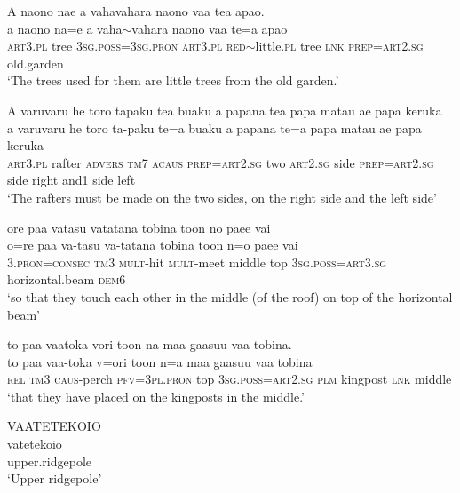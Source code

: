 \ea\label{ex:text11-30}
A naono nae a vahavahara naono vaa tea apao.\\
\gll a	naono	na=e	a	vaha{$\sim$}vahara	naono	vaa	te=a	apao\\
     \textsc{art}3.\textsc{pl}	tree	3\textsc{sg}.\textsc{poss}=3\textsc{sg}.\textsc{pron}	\textsc{art}3.\textsc{pl}	\textsc{red}{$\sim$}little.\textsc{pl}	tree	\textsc{lnk}	\textsc{prep}=\textsc{art}2.\textsc{sg}	old.garden\\
\glt `The trees used for them are little trees from the old garden.'
\z

\ea\label{ex:text11-31}
A varuvaru he toro tapaku tea buaku a papana tea papa matau ae papa keruka\\
\gll a	varuvaru	he	toro	ta-paku	te=a	buaku	a	papana	te=a	papa	matau	ae	papa	keruka\\
     \textsc{art}3.\textsc{pl}	rafter	\textsc{advers}	\textsc{tm}7	\textsc{acaus}	\textsc{prep}=\textsc{art}2.\textsc{sg}	two	\textsc{art}2.\textsc{sg}	side	\textsc{prep}=\textsc{art}2.\textsc{sg}	side	right	and1	side	left\\
\glt `The rafters must be made on the two sides, on the right side and the left side'
\z

\ea\label{ex:text11-32}
ore paa vatasu vatatana tobina toon no paee vai\\
\gll o=re	paa	va-tasu	va-tatana	tobina	toon	n=o	paee	vai\\
     3.\textsc{pron}=\textsc{consec}	\textsc{tm}3	\textsc{mult}-hit	\textsc{mult}-meet	middle	top	3\textsc{sg}.\textsc{poss}=\textsc{art}3.\textsc{sg}	horizontal.beam	\textsc{dem}6\\
\glt `so that they touch each other in the middle (of the roof) on top of the horizontal beam'
\z

\ea\label{ex:text11-33}
to paa vaatoka vori toon na maa gaasuu vaa tobina.\\
\gll to	paa	vaa-toka	v=ori	toon	n=a	maa	gaasuu	vaa	tobina\\
     \textsc{rel}	\textsc{tm}3	\textsc{caus}-perch	\textsc{pfv}=3\textsc{pl}.\textsc{pron}	top	3\textsc{sg}.\textsc{poss}=\textsc{art}2.\textsc{sg}	\textsc{plm}	kingpost	\textsc{lnk}	middle\\
\glt `that they have placed on the kingposts in the middle.'
\z

\ea\label{ex:text11-34}
VAATETEKOIO\\
\gll vatetekoio\\
     upper.ridgepole\\
\glt `Upper ridgepole'
\z

